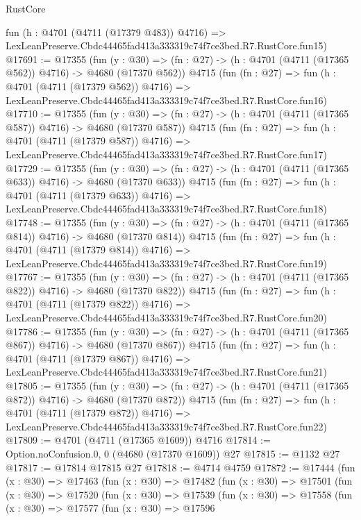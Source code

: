 \begin{lexlean}{RustCore}
\begin{coremodule}
    fun (h : @4701 (@4711 (@17379 @483)) @4716) =>
    LexLeanPreserve.Cbdc44465fad413a333319c74f7ce3bed.R7.RustCore.fun15)
@17691 := @17355
    (fun (y : @30) => (fn : @27) -> (h : @4701 (@4711 (@17365 @562)) @4716) -> @4680 (@17370 @562))
    @4715
    (fun (fn : @27) =>
    fun (h : @4701 (@4711 (@17379 @562)) @4716) =>
    LexLeanPreserve.Cbdc44465fad413a333319c74f7ce3bed.R7.RustCore.fun16)
@17710 := @17355
    (fun (y : @30) => (fn : @27) -> (h : @4701 (@4711 (@17365 @587)) @4716) -> @4680 (@17370 @587))
    @4715
    (fun (fn : @27) =>
    fun (h : @4701 (@4711 (@17379 @587)) @4716) =>
    LexLeanPreserve.Cbdc44465fad413a333319c74f7ce3bed.R7.RustCore.fun17)
@17729 := @17355
    (fun (y : @30) => (fn : @27) -> (h : @4701 (@4711 (@17365 @633)) @4716) -> @4680 (@17370 @633))
    @4715
    (fun (fn : @27) =>
    fun (h : @4701 (@4711 (@17379 @633)) @4716) =>
    LexLeanPreserve.Cbdc44465fad413a333319c74f7ce3bed.R7.RustCore.fun18)
@17748 := @17355
    (fun (y : @30) => (fn : @27) -> (h : @4701 (@4711 (@17365 @814)) @4716) -> @4680 (@17370 @814))
    @4715
    (fun (fn : @27) =>
    fun (h : @4701 (@4711 (@17379 @814)) @4716) =>
    LexLeanPreserve.Cbdc44465fad413a333319c74f7ce3bed.R7.RustCore.fun19)
@17767 := @17355
    (fun (y : @30) => (fn : @27) -> (h : @4701 (@4711 (@17365 @822)) @4716) -> @4680 (@17370 @822))
    @4715
    (fun (fn : @27) =>
    fun (h : @4701 (@4711 (@17379 @822)) @4716) =>
    LexLeanPreserve.Cbdc44465fad413a333319c74f7ce3bed.R7.RustCore.fun20)
@17786 := @17355
    (fun (y : @30) => (fn : @27) -> (h : @4701 (@4711 (@17365 @867)) @4716) -> @4680 (@17370 @867))
    @4715
    (fun (fn : @27) =>
    fun (h : @4701 (@4711 (@17379 @867)) @4716) =>
    LexLeanPreserve.Cbdc44465fad413a333319c74f7ce3bed.R7.RustCore.fun21)
@17805 := @17355
    (fun (y : @30) => (fn : @27) -> (h : @4701 (@4711 (@17365 @872)) @4716) -> @4680 (@17370 @872))
    @4715
    (fun (fn : @27) =>
    fun (h : @4701 (@4711 (@17379 @872)) @4716) =>
    LexLeanPreserve.Cbdc44465fad413a333319c74f7ce3bed.R7.RustCore.fun22)
@17809 := @4701 (@4711 (@17365 @1609)) @4716
@17814 := Option.noConfusion.{0, 0} (@4680 (@17370 @1609)) @27
@17815 := @1132 @27
@17817 := @17814 @17815 @27
@17818 := @4714 @4759
@17872 := @17444
    (fun (x : @30) =>
    @17463
      (fun (x : @30) =>
      @17482
        (fun (x : @30) =>
        @17501
          (fun (x : @30) =>
          @17520
            (fun (x : @30) =>
            @17539
              (fun (x : @30) =>
              @17558
                (fun (x : @30) =>
                @17577
                  (fun (x : @30) =>
                  @17596

\end{coremodule}
\end{lexlean}
